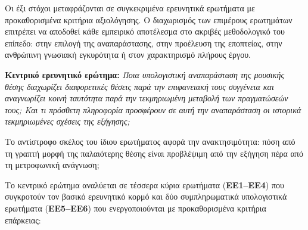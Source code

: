 \documentclass[11pt,a4paper]{article}
\begin{document}
Οι έξι στόχοι μεταφράζονται σε συγκεκριμένα ερευνητικά ερωτήματα με προκαθορισμένα κριτήρια αξιολόγησης. Ο διαχωρισμός των επιμέρους ερωτημάτων επιτρέπει να αποδοθεί κάθε εμπειρικό αποτέλεσμα στο ακριβές μεθοδολογικό του επίπεδο: στην επιλογή της αναπαράστασης, στην προέλευση της εποπτείας, στην ανθρώπινη γνωσιακή εγκυρότητα ή στον χαρακτηρισμό πλήρους έργου.

\textbf{Κεντρικό ερευνητικό ερώτημα:} \emph{Ποια υπολογιστική αναπαράσταση της μουσικής θέσης διαχωρίζει διαφορετικές θέσεις παρά την επιφανειακή τους συγγένεια και αναγνωρίζει κοινή ταυτότητα παρά την τεκμηριωμένη μεταβολή των πραγματώσεών τους; Και τι πρόσθετη πληροφορία προσφέρουν σε αυτή την αναπαράσταση οι ιστορικά τεκμηριωμένες σχέσεις της εξήγησης;}

Το αντίστροφο σκέλος του ίδιου ερωτήματος αφορά την ανακτησιμότητα: πόση από τη γραπτή μορφή της παλαιότερης θέσης είναι προβλέψιμη από την εξήγηση πέρα από τη μετροφωνική ανάγνωση;

Το κεντρικό ερώτημα αναλύεται σε τέσσερα κύρια ερωτήματα (\textbf{ΕΕ1--ΕΕ4}) που συγκροτούν τον βασικό ερευνητικό κορμό και δύο συμπληρωματικά υπολογιστικά ερωτήματα (\textbf{ΕΕ5--ΕΕ6}) που ενεργοποιούνται με προκαθορισμένα κριτήρια επάρκειας:
\end{document}
